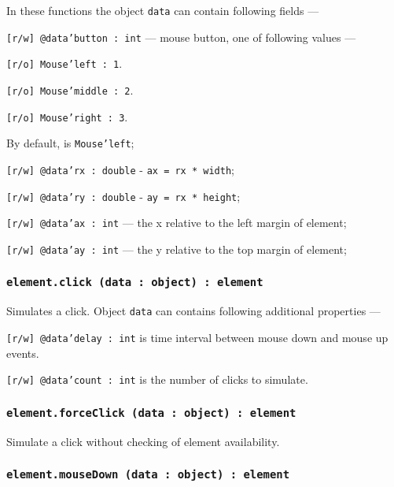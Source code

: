 In these functions the object \texttt{data} can contain following fields —
\begin{icItems}
    \item \texttt{[r/w] @data'button : int} — mouse button, one of following values —
	\begin{icItems}
	    \item \texttt{[r/o] Mouse'left : 1}.
		\item \texttt{[r/o] Mouse'middle : 2}.
		\item \texttt{[r/o] Mouse'right : 3}.
	\end{icItems}
	By default, is \texttt{Mouse'left};
	\item \texttt{[r/w] @data'rx : double} - \texttt{ax = rx * width};
	\item \texttt{[r/w] @data'ry : double} - \texttt{ay = rx * height};
	\item \texttt{[r/w] @data'ax : int} — the x relative to the left margin of element;
	\item \texttt{[r/w] @data'ay : int} — the y relative to the top margin of element;
\end{icItems}

\subsubsection{\texttt{element.click (data : object) : element}}

Simulates a click. Object \texttt{data} can contains following additional properties —
\begin{icItems}
	\item \texttt{[r/w] @data'delay : int} is time interval between mouse down and mouse up events.
	\item \texttt{[r/w] @data'count : int} is the number of clicks to simulate.
\end{icItems}

\subsubsection{\texttt{element.forceClick (data : object) : element}}

Simulate a click without checking of element availability.

\subsubsection{\texttt{element.mouseDown (data : object) : element}}

